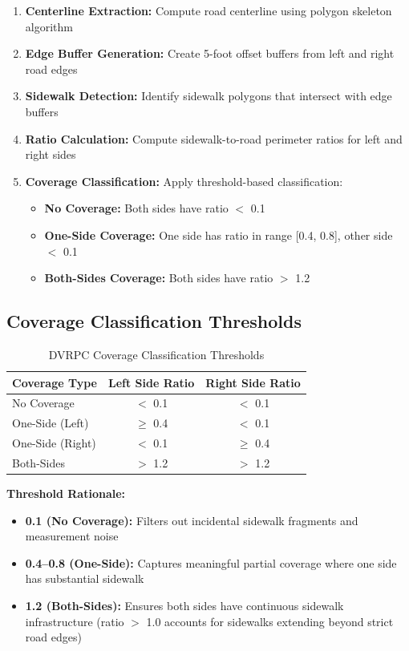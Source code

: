 \documentclass[11pt,letterpaper]{article}
\begin{document}
\begin{enumerate}
    \item \textbf{Centerline Extraction:} Compute road centerline using polygon skeleton algorithm
    \item \textbf{Edge Buffer Generation:} Create 5-foot offset buffers from left and right road edges
    \item \textbf{Sidewalk Detection:} Identify sidewalk polygons that intersect with edge buffers
    \item \textbf{Ratio Calculation:} Compute sidewalk-to-road perimeter ratios for left and right sides
    \item \textbf{Coverage Classification:} Apply threshold-based classification:
    \begin{itemize}
        \item \textbf{No Coverage:} Both sides have ratio $<$ 0.1
        \item \textbf{One-Side Coverage:} One side has ratio in range [0.4, 0.8], other side $<$ 0.1
        \item \textbf{Both-Sides Coverage:} Both sides have ratio $>$ 1.2
    \end{itemize}
\end{enumerate}

\subsection{Coverage Classification Thresholds}

\begin{table}[H]
\centering
\begin{tabular}{@{}lcc@{}}
\toprule
\textbf{Coverage Type} & \textbf{Left Side Ratio} & \textbf{Right Side Ratio} \\
\midrule
No Coverage & $<$ 0.1 & $<$ 0.1 \\
One-Side (Left) & $\geq$ 0.4 & $<$ 0.1 \\
One-Side (Right) & $<$ 0.1 & $\geq$ 0.4 \\
Both-Sides & $>$ 1.2 & $>$ 1.2 \\
\bottomrule
\end{tabular}
\caption{DVRPC Coverage Classification Thresholds}
\end{table}

\textbf{Threshold Rationale:}
\begin{itemize}
    \item \textbf{0.1 (No Coverage):} Filters out incidental sidewalk fragments and measurement noise
    \item \textbf{0.4--0.8 (One-Side):} Captures meaningful partial coverage where one side has substantial sidewalk
    \item \textbf{1.2 (Both-Sides):} Ensures both sides have continuous sidewalk infrastructure (ratio $>$ 1.0 accounts for sidewalks extending beyond strict road edges)
\end{itemize}
\end{document}
